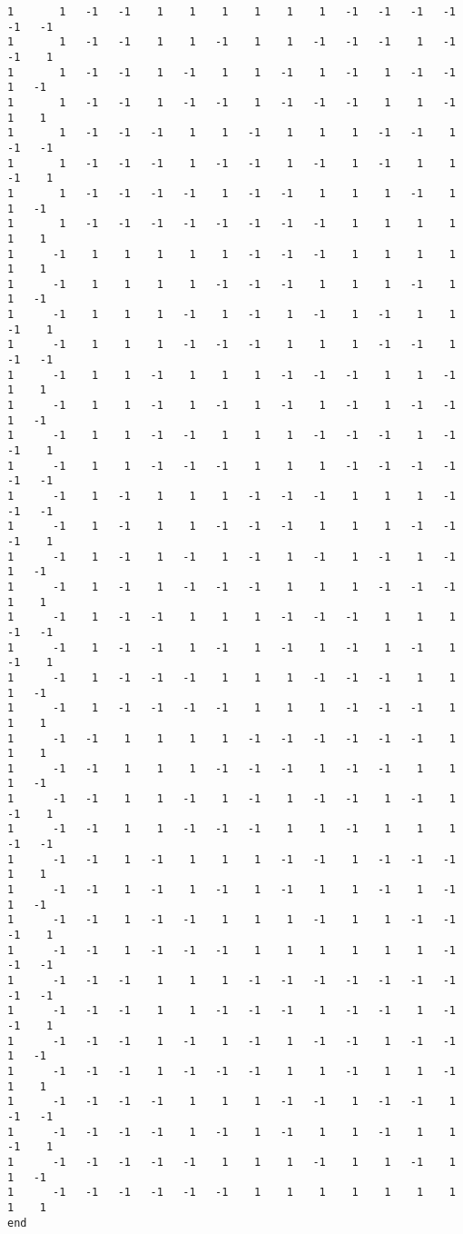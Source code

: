 \documentclass[%
 showpacs,
 showkeys,
 preprintnumbers,
 amsmath,amssymb,
 aps,
  pra,
  longbibliography,
 floatfix,
 ]{revtex4-1}
\begin{document}
{\begin{lstlisting}[backgroundcolor=\color{yellow!10},framerule=0pt,breaklines=true, frame=tb]
1       1   -1   -1    1    1    1    1    1    1   -1   -1   -1   -1   -1   -1
1       1   -1   -1    1    1   -1    1    1   -1   -1   -1    1   -1   -1    1
1       1   -1   -1    1   -1    1    1   -1    1   -1    1   -1   -1    1   -1
1       1   -1   -1    1   -1   -1    1   -1   -1   -1    1    1   -1    1    1
1       1   -1   -1   -1    1    1   -1    1    1    1   -1   -1    1   -1   -1
1       1   -1   -1   -1    1   -1   -1    1   -1    1   -1    1    1   -1    1
1       1   -1   -1   -1   -1    1   -1   -1    1    1    1   -1    1    1   -1
1       1   -1   -1   -1   -1   -1   -1   -1   -1    1    1    1    1    1    1
1      -1    1    1    1    1    1   -1   -1   -1    1    1    1    1    1    1
1      -1    1    1    1    1   -1   -1   -1    1    1    1   -1    1    1   -1
1      -1    1    1    1   -1    1   -1    1   -1    1   -1    1    1   -1    1
1      -1    1    1    1   -1   -1   -1    1    1    1   -1   -1    1   -1   -1
1      -1    1    1   -1    1    1    1   -1   -1   -1    1    1   -1    1    1
1      -1    1    1   -1    1   -1    1   -1    1   -1    1   -1   -1    1   -1
1      -1    1    1   -1   -1    1    1    1   -1   -1   -1    1   -1   -1    1
1      -1    1    1   -1   -1   -1    1    1    1   -1   -1   -1   -1   -1   -1
1      -1    1   -1    1    1    1   -1   -1   -1    1    1    1   -1   -1   -1
1      -1    1   -1    1    1   -1   -1   -1    1    1    1   -1   -1   -1    1
1      -1    1   -1    1   -1    1   -1    1   -1    1   -1    1   -1    1   -1
1      -1    1   -1    1   -1   -1   -1    1    1    1   -1   -1   -1    1    1
1      -1    1   -1   -1    1    1    1   -1   -1   -1    1    1    1   -1   -1
1      -1    1   -1   -1    1   -1    1   -1    1   -1    1   -1    1   -1    1
1      -1    1   -1   -1   -1    1    1    1   -1   -1   -1    1    1    1   -1
1      -1    1   -1   -1   -1   -1    1    1    1   -1   -1   -1    1    1    1
1      -1   -1    1    1    1    1   -1   -1   -1   -1   -1   -1    1    1    1
1      -1   -1    1    1    1   -1   -1   -1    1   -1   -1    1    1    1   -1
1      -1   -1    1    1   -1    1   -1    1   -1   -1    1   -1    1   -1    1
1      -1   -1    1    1   -1   -1   -1    1    1   -1    1    1    1   -1   -1
1      -1   -1    1   -1    1    1    1   -1   -1    1   -1   -1   -1    1    1
1      -1   -1    1   -1    1   -1    1   -1    1    1   -1    1   -1    1   -1
1      -1   -1    1   -1   -1    1    1    1   -1    1    1   -1   -1   -1    1
1      -1   -1    1   -1   -1   -1    1    1    1    1    1    1   -1   -1   -1
1      -1   -1   -1    1    1    1   -1   -1   -1   -1   -1   -1   -1   -1   -1
1      -1   -1   -1    1    1   -1   -1   -1    1   -1   -1    1   -1   -1    1
1      -1   -1   -1    1   -1    1   -1    1   -1   -1    1   -1   -1    1   -1
1      -1   -1   -1    1   -1   -1   -1    1    1   -1    1    1   -1    1    1
1      -1   -1   -1   -1    1    1    1   -1   -1    1   -1   -1    1   -1   -1
1      -1   -1   -1   -1    1   -1    1   -1    1    1   -1    1    1   -1    1
1      -1   -1   -1   -1   -1    1    1    1   -1    1    1   -1    1    1   -1
1      -1   -1   -1   -1   -1   -1    1    1    1    1    1    1    1    1    1
end


\end{lstlisting}}
\end{document}
